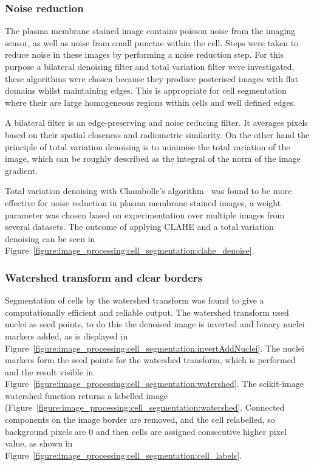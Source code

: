 \subsubsection{Noise reduction}
The plasma membrane stained image contains poisson noise from the imaging sensor, as well as noise from small punctae within the cell. Steps were taken to reduce noise in these images by performing a noise reduction step. For this purpose a bilateral denoising filter and total variation filter were investigated, these algorithms were chosen because they produce posterised images with flat domains whilst maintaining edges. This is appropriate for cell segmentation where their are large homogeneous regions within cells and well defined edges.

A bilateral filter is an edge-preserving and noise reducing filter. It averages pixels based on their spatial closeness and radiometric similarity. On the other hand the principle of total variation denoising is to minimise the total variation of the image, which can be roughly described as the integral of the norm of the image gradient. 

Total variation denoising with Chambolle's algorithm~\cite{Chambolle2004} was found to be more effective for noise reduction in plasma membrane stained images, a weight parameter was chosen based on experimentation over multiple images from several datasets. The outcome of applying CLAHE and a total variation denoising can be seen in Figure~\ref{figure:image_processing:cell_segmentation:clahe_denoise}.

\subsubsection{Watershed transform and clear borders}
Segmentation of cells by the watershed transform was found to give a computationally efficient and reliable output. The watershed transform used nuclei as seed points, to do this the denoised image is inverted and binary nuclei markers added, as is displayed in Figure~\ref{figure:image_processing:cell_segmentation:invertAddNuclei}. The nuclei markers form the seed points for the watershed transform, which is performed and the result visible in Figure~\ref{figure:image_processing:cell_segmentation:watershed}. The scikit-image watershed function returns a labelled image (Figure~\ref{figure:image_processing:cell_segmentation:watershed}. Connected components on the image border are removed, and the cell relabelled, so background pixels are 0 and then cells are assigned consecutive higher pixel value, as shown in Figure~\ref{figure:image_processing:cell_segmentation:cell_labels}.

